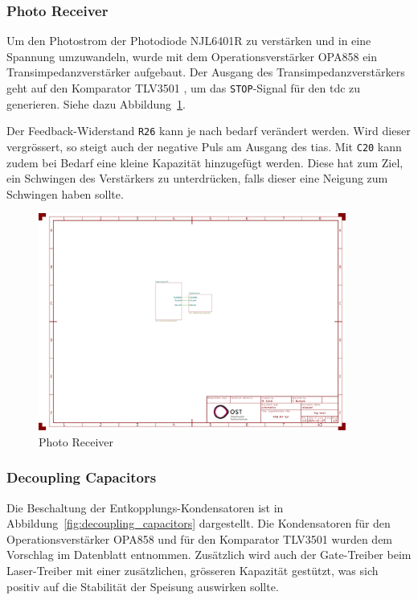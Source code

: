 \documentclass[11pt,a4paper,hidelinks]{article}
\begin{document}
\subsubsection{Photo Receiver}\label{sec:schematic_photo_receiver}

Um den Photostrom der Photodiode NJL6401R \cite{jrc2014njl6401r3_datasheet} zu verstärken und in eine Spannung umzuwandeln,
wurde mit dem Operationsverstärker OPA858 \cite{ti2018opa858_datasheet} ein Transimpedanzverstärker aufgebaut. Der
Ausgang des Transimpedanzverstärkers geht auf den Komparator TLV3501 \cite{ti2016tlv3501_datasheet}, um das \lstinline|STOP|-Signal
für den \acrshort{tdc} zu generieren. Siehe dazu Abbildung~\ref{fig:photo_receiver}.

Der Feedback-Widerstand \lstinline|R26| kann je nach bedarf verändert werden. Wird dieser vergrössert, so steigt auch der
negative Puls am Ausgang des \acrshort{tia}s. Mit \lstinline|C20| kann zudem bei Bedarf eine kleine Kapazität hinzugefügt
werden. Diese hat zum Ziel, ein Schwingen des Verstärkers zu unterdrücken, falls dieser eine Neigung zum Schwingen haben
sollte.

\begin{figure}[H]
    \centering
    \includegraphics[page=3, trim=100 240 600 340, clip, width=0.9\textwidth]{attachments/schematic.pdf}
    \caption{Photo Receiver}\label{fig:photo_receiver}
\end{figure}

\subsubsection{Decoupling Capacitors}

Die Beschaltung der Entkopplungs-Kondensatoren ist in Abbildung~\ref{fig:decoupling_capacitors} dargestellt. Die
Kondensatoren für den Operationsverstärker OPA858 und für den Komparator TLV3501 wurden dem Vorschlag im Datenblatt
entnommen. Zusätzlich wird auch der Gate-Treiber beim Laser-Treiber mit einer zusätzlichen, grösseren Kapazität gestützt,
was sich positiv auf die Stabilität der Speisung auswirken sollte.
\end{document}
